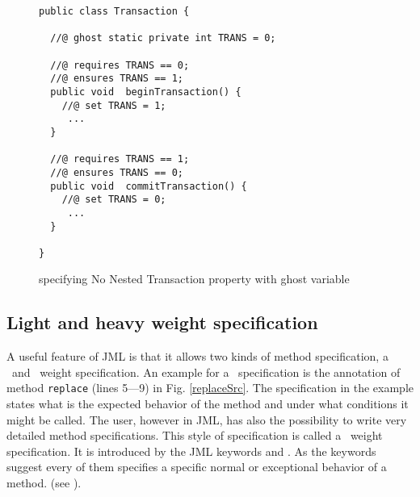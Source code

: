 \begin{figure}[ht!]
\begin{lstlisting}[frame=trbl] 
public class Transaction {

  //@ ghost static private int TRANS = 0; 
  
  //@ requires TRANS == 0;
  //@ ensures TRANS == 1;
  public void  beginTransaction() {
    //@ set TRANS = 1;
     ...
  }

  //@ requires TRANS == 1;
  //@ ensures TRANS == 0;
  public void  commitTransaction() {
    //@ set TRANS = 0; 
     ...
  }
  
}
\end{lstlisting}
\caption{\sc specifying No Nested Transaction property with ghost variable} 
\label{bml:ghost}
\end{figure}

\subsection{Light and heavy weight specification}\label{javaVerif:JML:lightHeavy}
A useful feature of JML is that it allows two kinds of method specification, a \light  \ and \heavy \ weight specification. 
An example for a \light \  specification is the annotation of method \texttt{replace} (lines 5---9) in Fig. \ref{replaceSrc}. The specification in 
the example states what is the expected behavior of the method and under what conditions it might be called.
The user, however in JML, has also the possibility
to write very detailed method specifications. This style of specification is called a \heavy  \ weight specification.
 It is introduced by the JML keywords  and . As the keywords
suggest every of them specifies a specific normal or exceptional behavior of a method.  (see \cite{PD06LBR}). 

